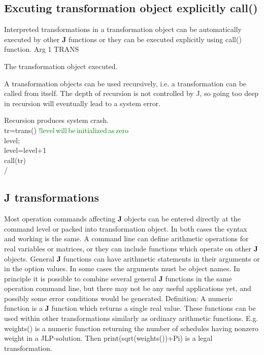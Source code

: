 \subsection{Excuting transformation object explicitly \textcolor{VioletRed}{call}()}
\label{call}
Interpreted transformations in a transformation object can be automatically executed by other \textbf{J}
functions or they can be executed explicitly using \textcolor{VioletRed}{call}() function.
\vspace{0.3cm}
\hline
\vspace{0.3cm}
\noindent Arg \tabto{3cm} 1 \tabto{5cm}  TRANS \tabto{7cm}
\begin{changemargin}{3cm}{0cm}
\noindent  The transformation object executed.
\end {changemargin}
\hline
\vspace{0.2cm}
\begin{note}
A transformation objects can be used recursively, i.e. a transformation can be called from
itself. The depth of recursion is not controlled by J, so going too deep in recursion will
eventually lead to a system error.
\end{note}
\begin{example}[recursion]Recursion produces system crash.\\
\label{recursion}
tr=\textcolor{VioletRed}{trans}() \textcolor{green}{!level\,will\,be\,initialized\,as\,zero}\\
level;\\
level=level+1\\
\textcolor{VioletRed}{call}(tr)\\
/
\end{example}
\subsection{\textbf{J} transformations}
\label{jtrans}
Most operation commands affecting \textbf{J} objects can be entered directly at the command level or
packed into transformation object. In both cases the syntax and working is the same. A
command line can define arithmetic operations for real variables or matrices, or they can
include functions which operate on other \textbf{J} objects. General \textbf{J} functions can have arithmetic
statements in their arguments or in the option values. In some cases the arguments must be
object names. In principle it is possible to combine several general \textbf{J} functions in the same
operation command line, but there may not be any useful applications yet, and possibly some
error conditions would be generated.
Definition: A numeric function is a \textbf{J} function which returns a single real value. These functions
can be used within other transformations similarly as ordinary arithmetic functions. E.g.
\textcolor{VioletRed}{weights}() is a numeric function returning the number of schedules having nonzero weight
in a JLP-solution. Then \textcolor{VioletRed}{print}(\textcolor{VioletRed}{sqrt}(\textcolor{VioletRed}{weights}())+Pi) is a legal transformation.
